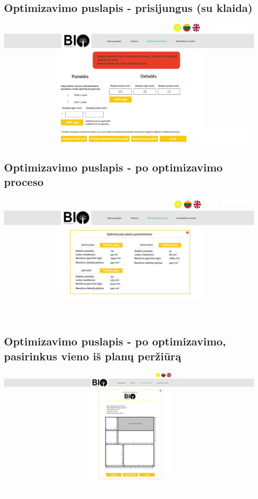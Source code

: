 \documentclass[a4paper,12pt]{article}
\begin{document}
\subsection{Optimizavimo puslapis - prisijungus (su klaida)}
\hspace{-2cm}
\includegraphics[scale=0.5]{interfeisai/optimizavimoPuslapisPrisijungusSuKlaida}

\subsection{Optimizavimo puslapis - po optimizavimo proceso}
\hspace{-2cm}
\includegraphics[scale=0.5]{interfeisai/optimizavimoPuslapisOptimizuotiPlanai}

\subsection{Optimizavimo puslapis - po optimizavimo, pasirinkus vieno iš planų peržiūrą}
\hspace{-2cm}
\includegraphics[scale=0.5]{interfeisai/optimizavimoPuslapisPrisijungusPasirinktoPerziura}
\end{document}
